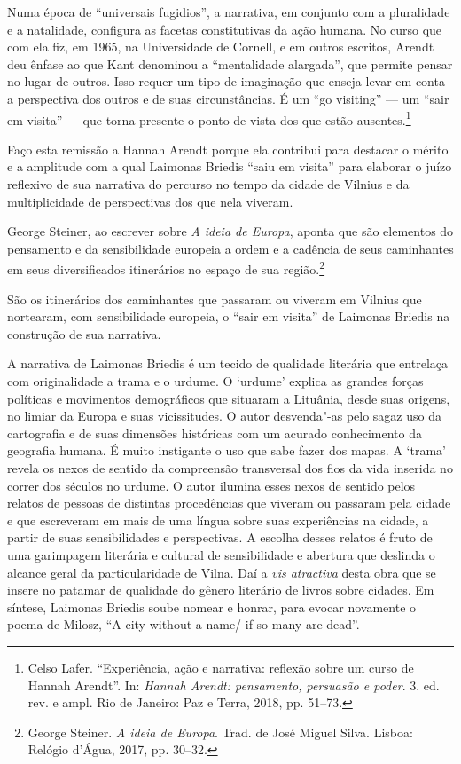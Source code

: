Numa época de ``universais fugidios'', a narrativa, em conjunto com a
pluralidade e a natalidade, configura as facetas constitutivas da ação
humana. No curso que com ela fiz, em 1965, na Universidade de Cornell, e
em outros escritos, Arendt deu ênfase ao que Kant denominou a
``mentalidade alargada'', que permite pensar no lugar de outros. Isso
requer um tipo de imaginação que enseja levar em conta a perspectiva dos
outros e de suas circunstâncias. É um ``go visiting'' --- um ``sair em
visita'' --- que torna presente o ponto de vista dos que estão
ausentes.\footnote{Celso Lafer. ``Experiência, ação e narrativa:
  reflexão sobre um curso de Hannah Arendt''. In: \textit{Hannah Arendt:
  pensamento, persuasão e poder}. 3. ed. rev. e ampl. Rio de Janeiro:
  Paz e Terra, 2018, pp. 51--73.}

Faço esta remissão a Hannah Arendt porque ela contribui para destacar o
mérito e a amplitude com a qual Laimonas Briedis ``saiu em visita'' para
elaborar o juízo reflexivo de sua narrativa do percurso no tempo da
cidade de Vilnius e da multiplicidade de perspectivas dos que nela
viveram.

George Steiner, ao escrever sobre \textit{A ideia de Europa}, aponta que
são elementos do pensamento e da sensibilidade europeia a ordem e a
cadência de seus caminhantes em seus diversificados itinerários no
espaço de sua região.\footnote{George Steiner. \textit{A ideia de Europa}.
  Trad. de José Miguel Silva. Lisboa: Relógio d'Água, 2017, pp. 30--32.}

São os itinerários dos caminhantes que passaram ou viveram em Vilnius
que nortearam, com sensibilidade europeia, o ``sair em visita'' de
Laimonas Briedis na construção de sua narrativa.

A narrativa de Laimonas Briedis é um tecido de qualidade literária que
entrelaça com originalidade a trama e o urdume. O `urdume' explica as
grandes forças políticas e movimentos demográficos que situaram a
Lituânia, desde suas origens, no limiar da Europa e suas vicissitudes. O
autor desvenda"-as pelo sagaz uso da cartografia e de suas dimensões
históricas com um acurado conhecimento da geografia humana. É muito
instigante o uso que sabe fazer dos mapas. A `trama' revela os nexos de
sentido da compreensão transversal dos fios da vida inserida no correr
dos séculos no urdume. O autor ilumina esses nexos de sentido pelos
relatos de pessoas de distintas procedências que viveram ou passaram
pela cidade e que escreveram em mais de uma língua sobre suas
experiências na cidade, a partir de suas sensibilidades e perspectivas.
A escolha desses relatos é fruto de uma garimpagem literária e cultural
de sensibilidade e abertura que deslinda o alcance geral da
particularidade de Vilna. Daí a \textit{vis atractiva} desta obra que se
insere no patamar de qualidade do gênero literário de livros sobre
cidades. Em síntese, Laimonas Briedis soube nomear e honrar, para evocar
novamente o poema de Milosz, ``A city without a name/ if so many are
dead''.

